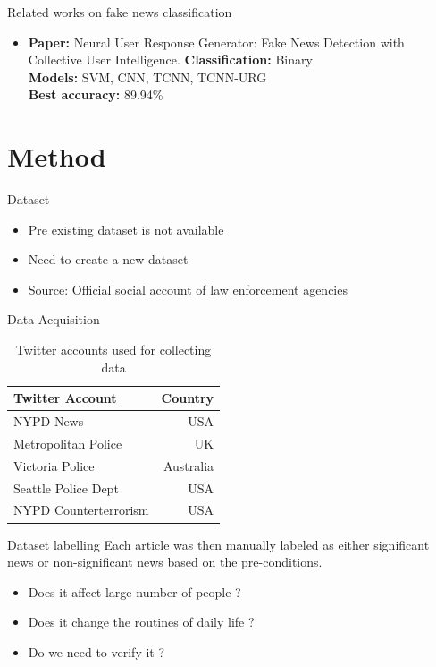 \documentclass[12pt]{beamer}
\begin{document}
\begin{frame}{Related works on fake news classification}
    \begin{itemize}
        \item
        \textbf{Paper:} Neural User Response Generator: Fake News Detection with Collective User Intelligence.
        \textbf{Classification:} Binary \\
        \textbf{Models:} SVM, CNN, TCNN, TCNN-URG \\
        \textbf{Best accuracy:} 89.94\% \\
    \end{itemize}
\end{frame}

\section{Method}

\begin{frame}{Dataset}
    \begin{itemize}
        \item Pre existing dataset is not available
        \item Need to create a new dataset
        \item Source: Official social account of law enforcement agencies
    \end{itemize}
\end{frame}

\begin{frame}{Data Acquisition}
\begin{table}
    \centering
    \label{tbl:twitter_users}
    \begin{tabular}{l r}
    \toprule
    Twitter Account & Country \\
    \midrule
    NYPD News & USA \\
    Metropolitan Police & UK \\
    Victoria Police & Australia \\
    Seattle Police Dept & USA \\
    NYPD Counterterrorism & USA \\
    \bottomrule
    \end{tabular}
    \caption{Twitter accounts used for collecting data}
\end{table}
\end{frame}

\begin{frame}{Dataset labelling}
    Each article was then manually labeled as either significant news or non-significant news based on the pre-conditions.
    \begin{itemize}
        \item Does it affect large number of people ?
        \item Does it change the routines of daily life ?
        \item Do we need to verify it ?
    \end{itemize}
\end{frame}
\end{document}
